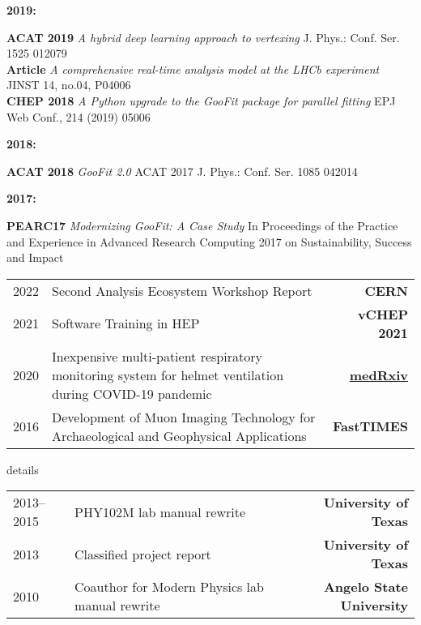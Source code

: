 \documentclass[10pt,letterpaper]{moderncv}
\begin{document}
\begin{minipage}[t]{.065\textwidth}
\textbf{2019:}
\end{minipage}%
\begin{minipage}[t]{.935\textwidth}
\textbf{ACAT 2019} \emph{A hybrid deep learning approach to vertexing} J. Phys.: Conf. Ser. 1525 012079 \\
\textbf{Article}   \emph{A comprehensive real-time analysis model at the LHCb experiment} JINST 14, no.04, P04006 \\
\textbf{CHEP 2018} \emph{A Python upgrade to the GooFit package for parallel fitting} EPJ Web Conf., 214 (2019) 05006
\end{minipage}

\begin{minipage}[t]{.065\textwidth}
\textbf{2018:}
\end{minipage}%
\begin{minipage}[t]{.935\textwidth}
\textbf{ACAT 2018} \emph{GooFit 2.0} ACAT 2017 J. Phys.: Conf. Ser. 1085 042014
\end{minipage}

\begin{minipage}[t]{.065\textwidth}
\textbf{2017:}
\end{minipage}%
\begin{minipage}[t]{.935\textwidth}
\textbf{PEARC17} \emph{Modernizing GooFit: A Case Study} In Proceedings of the Practice and Experience in Advanced Research Computing 2017 on Sustainability, Success and Impact
\end{minipage}


\begin{tabularx}{\textwidth}{p{.8in}X>{\bfseries}r}
2022 & Second Analysis Ecosystem Workshop Report & CERN \\
2021 & Software Training in HEP & vCHEP 2021 \\
2020 & Inexpensive multi-patient respiratory monitoring system for helmet ventilation during COVID-19 pandemic & \href{https://doi.org/10.1101/2020.06.29.20141283}{medRxiv} \\
2016 & Development of Muon Imaging Technology
for Archaeological and Geophysical Applications & FastTIMES \\
%
\end{tabularx}

\begin{taggedblock}{details}
\begin{tabularx}{\textwidth}{p{.8in}X>{\bfseries}r}
2013--2015 & PHY102M lab manual rewrite & University of Texas \\
2013 & Classified project report & University of Texas\\
2010 & Coauthor for Modern Physics lab manual rewrite & Angelo State University\\
\end{tabularx}
\end{taggedblock}
\end{document}
